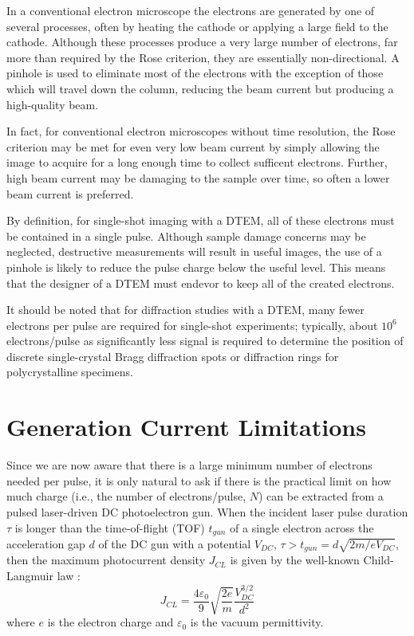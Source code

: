 In a conventional electron microscope the electrons are generated by one of several processes, often by heating the cathode or applying a large field to the cathode.
Although these processes produce a very large number of electrons, far more than required by the Rose criterion, they are essentially non-directional.
A pinhole is used to eliminate most of the electrons with the exception of those which will travel down the column, reducing the beam current but producing a high-quality beam. %

In fact, for conventional electron microscopes without time resolution, the Rose criterion may be met for even very low beam current by simply allowing the image to acquire for a long enough time to collect sufficent electrons.
Further, high beam current may be damaging to the sample over time, so often a lower beam current is preferred.

By definition, for single-shot imaging with a DTEM, all of these electrons must be contained in a single pulse.
Although sample damage concerns may be neglected, destructive measurements will result in useful images, the use of a pinhole is likely to reduce the pulse charge below the useful level.
This means that the designer of a DTEM must endevor to keep all of the created electrons.

It should be noted that for diffraction studies with a DTEM, many fewer electrons per pulse are required for single-shot experiments; typically, about $10^6$ electrons/pulse \cite{armstrong_practical_2007} as significantly less signal is required to determine the position of discrete single-crystal Bragg diffraction spots or diffraction rings for polycrystalline specimens.

\section{Generation Current Limitations} \label{sec:childs_law}

Since we are now aware that there is a large minimum number of electrons needed per pulse, it is only natural to ask if there is the practical limit on how much charge (i.e., the number of electrons/pulse, $N$) can be extracted from a pulsed laser-driven DC photoelectron gun.
When the incident laser pulse duration $\tau$ is longer than the time-of-flight (TOF) $t_{gun}$ of a single electron across the acceleration gap $d$ of the DC gun with a potential $V_{DC}$, $\tau > t_{gun} = d \sqrt{2m/eV_{DC}}$, then the maximum photocurrent density $J_{CL}$ is given by the well-known Child-Langmuir law \cite{child_discharge_1911,langmuir_effect_1923}:
\begin{equation}
  J_{CL} = \frac{4 \varepsilon_0}{9} \sqrt{\frac{2e}{m}} \frac{V_{DC}^{3/2}}{d^2}
\end{equation}
where $e$ is the electron charge and $\varepsilon_0$ is the vacuum permittivity.

